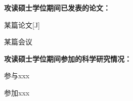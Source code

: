 \begin{publications}{99}
\item[] {\songti{}\bf{攻读硕士学位期间已发表的论文：}}
\item 某篇论文[J]
\item 某篇会议

\vspace{1.0cm}
\item[] {\songti{}\bf{攻读硕士学位期间参加的科学研究情况：}}
\setcounter{enumiv}{0}
\item 参与xxx
\item 参加xxx

\end{publications}
